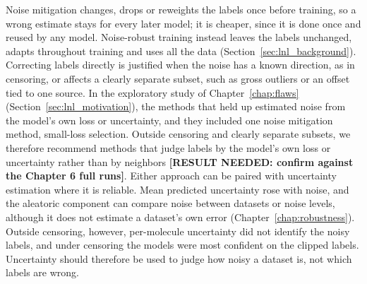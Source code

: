 Noise mitigation changes, drops or reweights the labels once before training, so a wrong estimate stays for every later model; it is cheaper, since it is done once and reused by any model. Noise-robust training instead leaves the labels unchanged, adapts throughout training and uses all the data \citep{Song2022} (Section~\ref{sec:lnl_background}). Correcting labels directly is justified when the noise has a known direction, as in censoring, or affects a clearly separate subset, such as gross outliers or an offset tied to one source. In the exploratory study of Chapter~\ref{chap:flaws} (Section~\ref{sec:lnl_motivation}), the methods that held up estimated noise from the model's own loss or uncertainty, and they included one noise mitigation method, small-loss selection. Outside censoring and clearly separate subsets, we therefore recommend methods that judge labels by the model's own loss or uncertainty rather than by neighbors \textbf{[RESULT NEEDED: confirm against the Chapter 6 full runs]}. Either approach can be paired with uncertainty estimation where it is reliable. Mean predicted uncertainty rose with noise, and the aleatoric component can compare noise between datasets or noise levels, although it does not estimate a dataset's own error (Chapter~\ref{chap:robustness}). Outside censoring, however, per-molecule uncertainty did not identify the noisy labels, and under censoring the models were most confident on the clipped labels. Uncertainty should therefore be used to judge how noisy a dataset is, not which labels are wrong.

